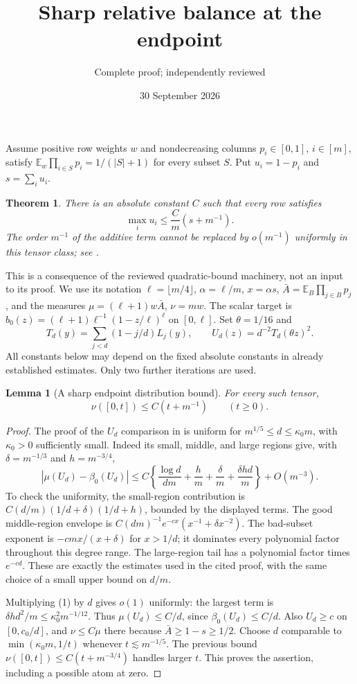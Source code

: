 \documentclass[11pt]{article}
\title{Sharp relative balance at the endpoint}
\author{Complete proof; independently reviewed}
\date{30 September 2026}
\newtheorem{theorem}{Theorem}
\newtheorem{lemma}{Lemma}
\newcommand{\E}{\mathbb E}
\begin{document}
\maketitle
Assume positive row weights $w$ and nondecreasing columns
$p_i\in[0,1]$, $i\in[m]$, satisfy
$\E_w\prod_{i\in S}p_i=1/(|S|+1)$ for every subset $S$.
Put $u_i=1-p_i$ and $s=\sum_i u_i$.

\begin{theorem}\label{main}
There is an absolute constant $C$ such that every row satisfies
\[
 \max_i u_i\le\frac C m(s+m^{-1}).
\]
The order $m^{-1}$ of the additive term cannot be replaced by
$o(m^{-1})$ uniformly in this tensor class; see
.
\end{theorem}

This is a consequence of the reviewed quadratic-bound machinery,
not an input to its proof. We use its notation
$\ell=\lfloor m/4\rfloor$, $\alpha=\ell/m$, $x=\alpha s$,
$\bar A=\E_B\prod_{j\in B}p_j$, and the measures
$\mu=(\ell+1)w\bar A$, $\nu=mw$. The scalar target is
$b_0(z)=(\ell+1)\ell^{-1}(1-z/\ell)^\ell$ on $[0,\ell]$.
Set $\theta=1/16$ and
\[
 T_d(y)=\sum_{j<d}(1-j/d)L_j(y),\qquad
 U_d(z)=d^{-2}T_d(\theta z)^2.
\]
All constants below may depend on the fixed absolute constants in
already established estimates. Only two further iterations are used.

\begin{lemma}[A sharp endpoint distribution bound]\label{sharpCDF}
For every such tensor,
\[
 \nu([0,t])\le C(t+m^{-1})\qquad(t\ge0).
\]
\end{lemma}
\begin{proof}
The proof of the $U_d$ comparison in
 is uniform for
$m^{1/5}\le d\le\kappa_0m$, with $\kappa_0>0$ sufficiently small.
Indeed its small, middle, and large regions give, with
$\delta=m^{-1/3}$ and $h=m^{-3/4}$,
\[
 |\mu(U_d)-\beta_0(U_d)|
 \le C\left\{\frac{\log d}{dm}+\frac hm+
                   \frac\delta m+\frac{\delta hd}m\right\}
       +O(m^{-3}).                                      \tag{1}
\]
To check the uniformity, the small-region contribution is
$C(d/m)(1/d+\delta)(1/d+h)$, bounded by the displayed terms.
The good middle-region envelope is
$C(dm)^{-1}e^{-cx}(x^{-1}+\delta x^{-2})$.
The bad-subset exponent is $-cmx/(x+\delta)$ for $x>1/d$;
it dominates every polynomial factor throughout this degree range.
The large-region tail has a polynomial factor times $e^{-cd}$.
These are exactly the estimates used in the cited proof, with the
same choice of a small upper bound on $d/m$.

Multiplying (1) by $d$ gives $o(1)$ uniformly: the largest term is
$\delta h d^2/m\le\kappa_0^2m^{-1/12}$.
Thus $\mu(U_d)\le C/d$, since $\beta_0(U_d)\le C/d$.
Also $U_d\ge c$ on $[0,c_0/d]$, and $\nu\le C\mu$ there because
$\bar A\ge1-s\ge1/2$. Choose $d$ comparable to
$\min(\kappa_0m,1/t)$ whenever $t\lesssim m^{-1/5}$.
The previous bound $\nu([0,t])\le C(t+m^{-3/4})$ handles larger $t$.
This proves the assertion, including a possible atom at zero.
\end{proof}
\end{document}
